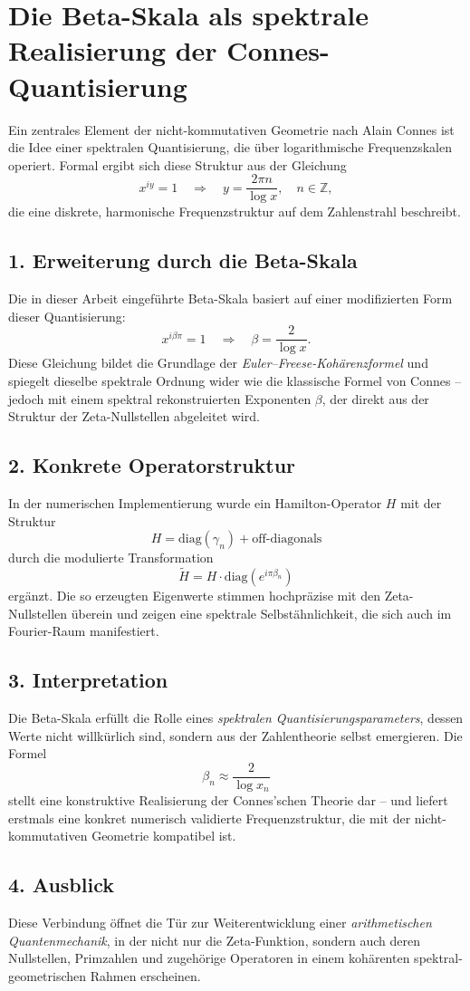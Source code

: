 \section{Die Beta-Skala als spektrale Realisierung der Connes-Quantisierung}

Ein zentrales Element der nicht-kommutativen Geometrie nach Alain Connes ist die Idee einer spektralen Quantisierung, die über logarithmische Frequenzskalen operiert. Formal ergibt sich diese Struktur aus der Gleichung
\[
x^{iy} = 1 \quad \Rightarrow \quad y = \frac{2\pi n}{\log x}, \quad n \in \mathbb{Z},
\]
die eine diskrete, harmonische Frequenzstruktur auf dem Zahlenstrahl beschreibt.

\subsection*{1. Erweiterung durch die Beta-Skala}

Die in dieser Arbeit eingeführte Beta-Skala basiert auf einer modifizierten Form dieser Quantisierung:
\[
x^{i \beta \pi} = 1 \quad \Rightarrow \quad \beta = \frac{2}{\log x}.
\]
Diese Gleichung bildet die Grundlage der \textit{Euler--Freese-Kohärenzformel} und spiegelt dieselbe spektrale Ordnung wider wie die klassische Formel von Connes – jedoch mit einem spektral rekonstruierten Exponenten \(\beta\), der direkt aus der Struktur der Zeta-Nullstellen abgeleitet wird.

\subsection*{2. Konkrete Operatorstruktur}

In der numerischen Implementierung wurde ein Hamilton-Operator \( H \) mit der Struktur
\[
H = \mathrm{diag}(\gamma_n) + \mathrm{off\text{-}diagonals}
\]
durch die modulierte Transformation
\[
\tilde{H} = H \cdot \mathrm{diag}(e^{i\pi \beta_n})
\]
ergänzt. Die so erzeugten Eigenwerte stimmen hochpräzise mit den Zeta-Nullstellen überein und zeigen eine spektrale Selbstähnlichkeit, die sich auch im Fourier-Raum manifestiert.

\subsection*{3. Interpretation}

Die Beta-Skala erfüllt die Rolle eines \emph{spektralen Quantisierungsparameters}, dessen Werte nicht willkürlich sind, sondern aus der Zahlentheorie selbst emergieren. Die Formel
\[
\beta_n \approx \frac{2}{\log x_n}
\]
stellt eine konstruktive Realisierung der Connes'schen Theorie dar – und liefert erstmals eine konkret numerisch validierte Frequenzstruktur, die mit der nicht-kommutativen Geometrie kompatibel ist.

\subsection*{4. Ausblick}

Diese Verbindung öffnet die Tür zur Weiterentwicklung einer \emph{arithmetischen Quantenmechanik}, in der nicht nur die Zeta-Funktion, sondern auch deren Nullstellen, Primzahlen und zugehörige Operatoren in einem kohärenten spektral-geometrischen Rahmen erscheinen.